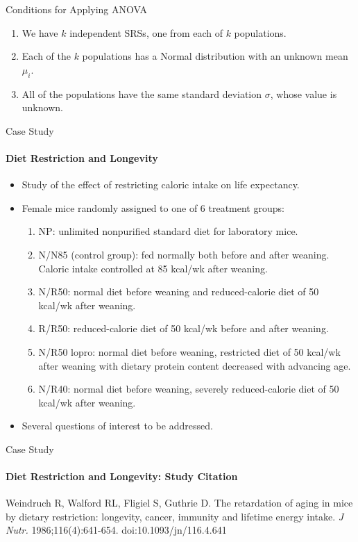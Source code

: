 \documentclass[t,xcolor=pdftex,dvipsnames,table,handout]{beamer}
\newcommand{\bi}{\begin{itemize}}
\newcommand{\ei}{\end{itemize}}
\begin{document}
\begin{frame}{Conditions for Applying ANOVA}
  \begin{enumerate}
    \item We have \alert{$k$ independent SRSs}, one from each of $k$ populations.\pause
      \item Each of the $k$ populations has a \alert{Normal
          distribution} with   an unknown mean $\mu_i$. \pause
        \item All of the populations  have the \alert{same standard deviation}  $\sigma$, whose value is unknown.
  \end{enumerate}
\end{frame}
\begin{frame}{Case Study}
\framesubtitle{Diet Restriction and Longevity}
\bi
    \item  Study of the effect
of restricting caloric intake on life expectancy. \pause
    \item Female mice randomly assigned to one of 6 treatment
    groups:
    \begin{enumerate}
        \item \alert{NP:} unlimited nonpurified standard diet for
        laboratory mice. \pause
        \item   \alert{N/N85 (control group):} fed normally both before and after
        weaning. Caloric intake controlled at 85 kcal/wk after
        weaning. \pause
        \item \alert{N/R50:} normal diet before weaning and
        reduced-calorie diet of 50 kcal/wk after weaning. \pause
        \item \alert{R/R50:} reduced-calorie diet of 50 kcal/wk
        before and after weaning. \pause
        \item \alert{N/R50 lopro:} normal diet before weaning,
        restricted diet of 50 kcal/wk after weaning with dietary
        protein content decreased with advancing age. \pause
        \item \alert{N/R40:} normal diet before weaning, severely
        reduced-calorie diet of 50 kcal/wk after weaning.
    \end{enumerate}
    \pause
    \item Several questions of interest to be addressed.

 \ei

\end{frame}
\begin{frame}{Case Study}
  \framesubtitle{Diet Restriction and Longevity: Study Citation}
 
Weindruch R, Walford RL, Fligiel S, Guthrie D. The retardation of
aging in mice by dietary restriction: longevity, cancer, immunity and
lifetime energy intake. \emph{J
Nutr.} 1986;116(4):641-654. doi:10.1093/jn/116.4.641

\end{frame}
\end{document}
